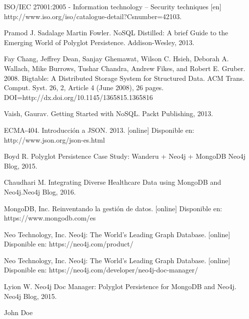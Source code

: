\documentclass[conference]{IEEEtran}
\begin{document}
\ifCLASSOPTIONcaptionsoff
  \newpage
\fi


\begin{thebibliography}{1}

ISO/IEC 27001:2005 - Information technology -- Security    techniques [en]
\\
http://www.iso.org/iso/catalogue-detail?Csnumber=42103.

Pramod J. Sadalage Martin Fowler. NoSQL Distilled: A brief Guide to the Emerging
World of Polyglot Persistence. Addison-Wesley, 2013.

Fay Chang, Jeffrey Dean, Sanjay Ghemawat, Wilson C. Hsieh, Deborah A. Wallach, Mike Burrows, Tushar Chandra, Andrew Fikes, and Robert E. Gruber. 2008. Bigtable: A Distributed Storage System for Structured Data. ACM Trans. Comput. Syst. 26, 2, Article 4 (June 2008), 26 pages. DOI=http://dx.doi.org/10.1145/1365815.1365816

Vaish, Gaurav. Getting Started with NoSQL. Packt Publishing, 2013.

ECMA-404. Introducción a JSON. 2013. [online]
Disponible en: http://www.json.org/json-es.html

Boyd R. Polyglot Persistence Case Study: Wanderu + Neo4j + MongoDB Neo4j Blog, 2015.

Chaudhari M. Integrating Diverse Healthcare Data using MongoDB and Neo4j.Neo4j Blog, 2016.

MongoDB, Inc. Reinventando la gestión de datos. [online]
Disponible en: https://www.mongodb.com/es

Neo Technology, Inc. Neo4j: The World’s Leading Graph Database. [online]
Disponible en: https://neo4j.com/product/

Neo Technology, Inc. Neo4j: The World’s Leading Graph Database. [online]
Disponible en: https://neo4j.com/developer/neo4j-doc-manager/

Lyion W. Neo4j Doc Manager: Polyglot Persistence for MongoDB and Neo4j. Neo4j Blog, 2015.

\end{thebibliography}

\begin{IEEEbiography}{John Doe}
\blindtext
\end{IEEEbiography}
\end{document}

